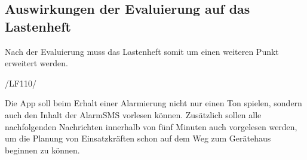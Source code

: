 \subsection{Auswirkungen der Evaluierung auf das Lastenheft}
Nach der Evaluierung muss das Lastenheft somit um einen weiteren Punkt erweitert werden.

\begin{minipage}{3cm}
/LF110/
\end{minipage}
\begin{minipage}{12,2cm}
Die App soll beim Erhalt einer Alarmierung nicht nur einen Ton spielen, sondern auch den Inhalt der AlarmSMS vorlesen k\"onnen. Zus\"atzlich sollen alle nachfolgenden Nachrichten innerhalb von f\"unf Minuten auch vorgelesen werden, um die Planung von Einsatzkr\"aften schon auf dem Weg zum Ger\"atehaus beginnen zu k\"onnen.\\
\end{minipage}